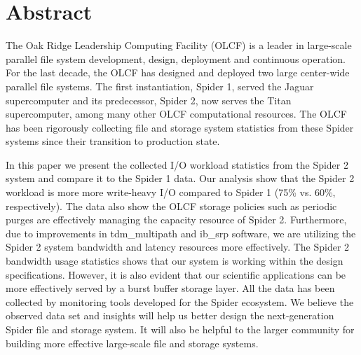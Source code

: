 \section*{Abstract}
\label{sec:abstract}

The Oak Ridge Leadership Computing Facility (OLCF) is a leader in large-scale
parallel file system development, design, deployment and continuous operation.
For the last decade, the OLCF has designed and deployed two large center-wide
parallel file systems. The first instantiation, Spider 1, served the Jaguar 
supercomputer and its predecessor, Spider 2, now serves the Titan supercomputer, 
among many other OLCF computational resources. The OLCF has been rigorously 
collecting file and storage system statistics from these Spider systems since their
transition to production state.

In this paper we present the collected I/O workload statistics from the Spider
2 system and compare it to the Spider 1 data. Our analysis show that the Spider 2
workload is more more write-heavy I/O compared to Spider 1 (75\%
vs. 60\%, respectively). The data also show the OLCF storage policies
such as periodic purges are effectively managing the capacity resource of
Spider 2.  Furthermore, due to improvements in tdm\_multipath and ib\_srp
software, we are utilizing the Spider 2 system bandwidth and latency resources
more effectively.  The Spider 2 bandwidth usage statistics shows that our
system is working within the design specifications. However, it is also evident
that our scientific applications can be more effectively served by a burst
buffer storage layer.  All the data has been collected by monitoring tools
developed for the Spider ecosystem. We believe the observed data set and
insights will help us better design the next-generation Spider file and storage
system. It will also be helpful to the larger community for building more
effective large-scale file and storage systems.

 
